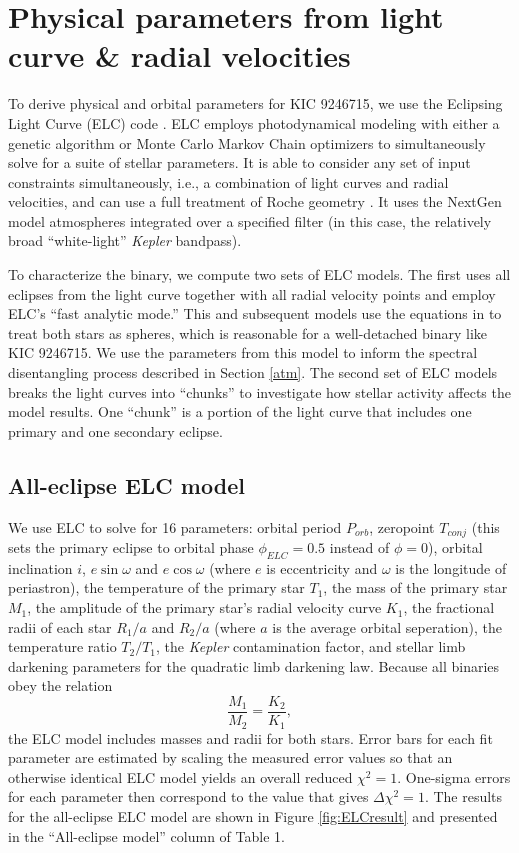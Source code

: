 \section{Physical parameters from light curve \& radial velocities}\label{model}
To derive physical and orbital parameters for KIC 9246715, we use the Eclipsing Light Curve (ELC) code \citep{oro00}. ELC employs photodynamical modeling with either a genetic algorithm or Monte Carlo Markov Chain optimizers to simultaneously solve for a suite of stellar parameters. It is able to consider any set of input constraints simultaneously, i.e., a combination of light curves and radial velocities, and can use a full treatment of Roche geometry \citep{kop69,avn75}. It uses the NextGen model atmospheres integrated over a specified filter (in this case, the relatively broad ``white-light'' \emph{Kepler} bandpass).

To characterize the binary, we compute two sets of ELC models. The first uses all eclipses from the light curve together with all radial velocity points and employ ELC's ``fast analytic mode.'' This and subsequent models use the equations in \citet{man02} to treat both stars as spheres, which is reasonable for a well-detached binary like KIC 9246715. We use the parameters from this model to inform the spectral disentangling process described in Section \ref{atm}. The second set of ELC models breaks the light curves into ``chunks'' to investigate how stellar activity affects the model results. One ``chunk'' is a portion of the light curve that includes one primary and one secondary eclipse.

\subsection{All-eclipse ELC model}

We use ELC to solve for 16 parameters: orbital period $P_{orb}$, zeropoint $T_{conj}$ (this sets the primary eclipse to orbital phase $\phi_{ELC} = 0.5$ instead of $\phi = 0$), orbital inclination $i$, $e \sin \omega$ and $e \cos \omega$ (where $e$ is eccentricity and $\omega$ is the longitude of periastron), the temperature of the primary star $T_1$, the mass of the primary star $M_1$, the amplitude of the primary star's radial velocity curve $K_1$, the fractional radii of each star $R_1/a$ and $R_2/a$ (where $a$ is the average orbital seperation), the temperature ratio $T_2/T_1$, the \emph{Kepler} contamination factor, and stellar limb darkening parameters for the quadratic limb darkening law. Because all binaries obey the relation
\begin{equation}
\frac{M_1}{M_2} = \frac{K_2}{K_1},
\end{equation}
the ELC model includes masses and radii for both stars. Error bars for each fit parameter are estimated by scaling the measured error values so that an otherwise identical ELC model yields an overall reduced $\chi^2 = 1$. One-sigma errors for each parameter then correspond to the value that gives $\Delta \chi^2 = 1$. The results for the all-eclipse ELC model are shown in Figure \ref{fig:ELCresult} and presented in the ``All-eclipse model'' column of Table 1.
